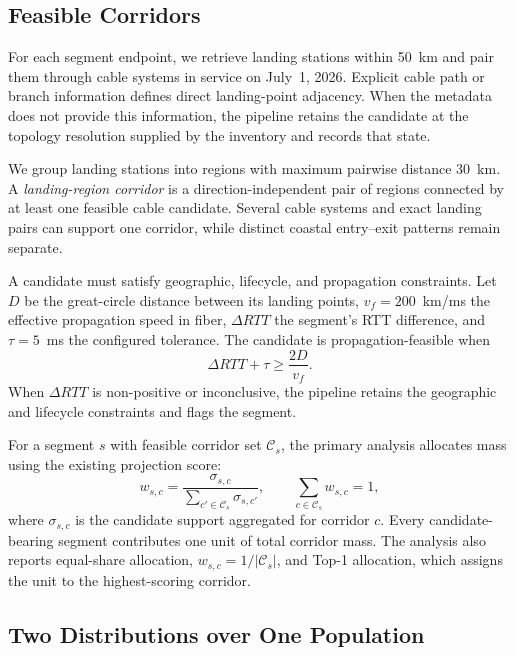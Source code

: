 \subsection{Feasible Corridors}
\label{sec:framework_projection}

For each segment endpoint, we retrieve landing stations within 50~km and pair
them through cable systems in service on July~1, 2026. Explicit cable path or
branch information defines direct landing-point adjacency. When the metadata
does not provide this information, the pipeline retains the candidate at the
topology resolution supplied by the inventory and records that state.

We group landing stations into regions with maximum pairwise distance
30~km. A \emph{landing-region corridor} is a direction-independent pair of
regions connected by at least one feasible cable candidate. Several cable
systems and exact landing pairs can support one corridor, while distinct
coastal entry--exit patterns remain separate.

A candidate must satisfy geographic, lifecycle, and propagation constraints.
Let $D$ be the great-circle distance between its landing points,
$v_f=200$~km/ms the effective propagation speed in fiber,
$\Delta RTT$ the segment's RTT difference, and $\tau=5$~ms the
configured tolerance. The candidate is propagation-feasible when
\begin{equation}
  \Delta RTT + \tau \geq \frac{2D}{v_f}.
  \label{eq:rtt-feasibility}
\end{equation}
When $\Delta RTT$ is non-positive or inconclusive, the pipeline retains the
geographic and lifecycle constraints and flags the segment.

For a segment $s$ with feasible corridor set $\mathcal{C}_s$, the primary
analysis allocates mass using the existing projection score:
\begin{equation}
  w_{s,c} =
  \frac{\sigma_{s,c}}
       {\sum_{c'\in\mathcal{C}_s}\sigma_{s,c'}},
  \qquad
  \sum_{c\in\mathcal{C}_s}w_{s,c}=1,
  \label{eq:mass}
\end{equation}
where $\sigma_{s,c}$ is the candidate support aggregated for corridor $c$.
Every candidate-bearing segment contributes one unit of total corridor mass.
The analysis also reports equal-share allocation,
$w_{s,c}=1/|\mathcal{C}_s|$, and Top-1 allocation, which assigns the unit to
the highest-scoring corridor.

\subsection{Two Distributions over One Population}
\label{sec:framework_distributions}

